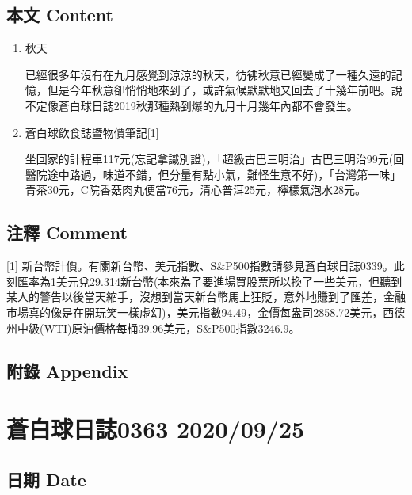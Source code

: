 \documentclass[a5paper, 11pt
]{book}
\begin{document}
\hypertarget{ux672cux6587-content-23}{%
\subsection{本文 Content}\label{ux672cux6587-content-23}}

\begin{enumerate}
\def\labelenumi{\arabic{enumi}.}
\item
  秋天

  已經很多年沒有在九月感覺到涼涼的秋天，彷彿秋意已經變成了一種久遠的記憶，但是今年秋意卻悄悄地來到了，或許氣候默默地又回去了十幾年前吧。說不定像蒼白球日誌2019秋那種熱到爆的九月十月幾年內都不會發生。
\item
  蒼白球飲食誌暨物價筆記{[}1{]}

  坐回家的計程車117元(忘記拿識別證)，「超級古巴三明治」古巴三明治99元(回醫院途中路過，味道不錯，但分量有點小氣，難怪生意不好)，「台灣第一味」青茶30元，C院香菇肉丸便當76元，清心普洱25元，檸檬氣泡水28元。
\end{enumerate}

\hypertarget{ux6ce8ux91cb-comment-23}{%
\subsection{注釋 Comment}\label{ux6ce8ux91cb-comment-23}}

{[}1{]}
新台幣計價。有關新台幣、美元指數、S\&P500指數請參見蒼白球日誌0339。此刻匯率為1美元兌29.314新台幣(本來為了要進場買股票所以換了一些美元，但聽到某人的警告以後當天縮手，沒想到當天新台幣馬上狂貶，意外地賺到了匯差，金融市場真的像是在開玩笑一樣虛幻)，美元指數94.49，金價每盎司2858.72美元，西德州中級(WTI)原油價格每桶39.96美元，S\&P500指數3246.9。

\hypertarget{ux9644ux9304-appendix-23}{%
\subsection{附錄 Appendix}\label{ux9644ux9304-appendix-23}}

\hypertarget{ux84bcux767dux7403ux65e5ux8a8c0363-20200925}{%
\section{蒼白球日誌0363
2020/09/25}\label{ux84bcux767dux7403ux65e5ux8a8c0363-20200925}}

\hypertarget{ux65e5ux671f-date-24}{%
\subsection{日期 Date}\label{ux65e5ux671f-date-24}}
\end{document}
